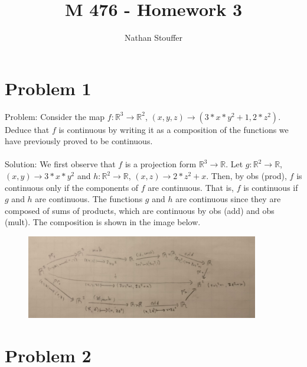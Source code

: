 \documentclass{article}
\begin{document}
\title{M 476 - Homework 3}
\author{Nathan Stouffer}

\maketitle
\newpage

\section*{Problem 1}

Problem: Consider the map $f: \mathbb{R}^3 \to \mathbb{R}^2$, $(x,y,z) \to (3*x*y^2 + 1, 2*z^2)$. Deduce that $f$ is continuous by writing it as a composition of the functions we have previously proved to be continuous. \\\\
Solution: We first observe that $f$ is a projection form $\mathbb{R}^3 \to \mathbb{R}$. Let $g: \mathbb{R}^2 \to \mathbb{R}$, $(x,y) \to 3*x*y^2$ and $h: \mathbb{R}^2 \to \mathbb{R}$, $(x,z) \to 2*z^2 + x$. Then, by obs (prod), $f$ is continuous only if the components of $f$ are continuous. That is, $f$ is continuous if $g$ and $h$ are continuous. The functions $g$ and $h$ are continuous since they are composed of sums of products, which are continuous by obs (add) and obs (mult). The composition is shown in the image below.
\begin{figure}[h]
	\centering
	\includegraphics[width=4in]{composition-map}
\end{figure}

\newpage

\section*{Problem 2}
\end{document}
